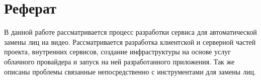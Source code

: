 \section*{Реферат}

В данной работе рассматривается процесс разработки сервиса для автоматической замены лиц на видео. Рассматривается разработка клиентской и серверной частей проекта, внутренних сервисов, создание инфраструктуры на основе услуг облачного провайдера и запуск на ней разработанного приложения. Так же описаны проблемы связанные непосредственно с инструментами для замены лиц.